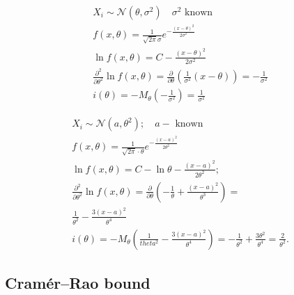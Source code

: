 \begin{example}
    \begin{gather*}
        X_i \sim \mathcal{N}(\theta, \sigma^2) \quad \sigma^2 \text{ known}\\
        f(x, \theta) = \frac{1}{\sqrt{2\pi} \sigma} e^{-\frac{\left( 
        x - \theta \right) ^2}{2\sigma^2}} \\
        \ln f(x, \theta) = C - \frac{\left( x-\theta \right) ^2}{2\sigma^2}\\
        \frac{\partial ^2}{\partial \theta^2} \ln f(x, \theta) = 
        \frac{\partial}{\partial \theta} \left( 
        \frac{1}{\sigma^2}\left( x - \theta \right) \right) =
        - \frac{1}{\sigma^2} \\
        i(\theta) = - M_{\theta} \left( -\frac{1}{\sigma^2} \right)
        = \frac{1}{\sigma^2}
    \end{gather*}
\end{example}

\begin{example}
    \begin{gather*}
        X_i \sim \mathcal{N}(a, \theta^2); \quad a - \text{ known} \\
        f(x, \theta) = \frac{1}{\sqrt{2\pi} \cdot \theta} e^{-\frac{\left( 
        x - a \right) ^2}{2 \theta^2} } \\
        \ln f(x, \theta) = C - \ln \theta - \frac{\left( x-a \right) ^2}{
        2\theta^2}; \\
        \frac{\partial ^2}{\partial \theta^2} \ln f(x, \theta) =
        \frac{\partial}{\partial \theta} \left(
        -\frac{1}{\theta} + \frac{\left( x-a \right) ^2}{\theta^{3}}\right) = \\
        \frac{1}{\theta^2} - \frac{3\left( x-a \right) ^2}{\theta^4} \\
        i(\theta) = - M_{\theta} \left( \frac{1}{theta^2} -
        \frac{3\left( x-a \right) ^2}{\theta^4}\right) = 
        -\frac{1}{\theta^2} + \frac{3\theta^2}{\theta^4} =
        \frac{2}{\theta^2}.
    \end{gather*}
\end{example}


\subsection{Cramér–Rao bound}

